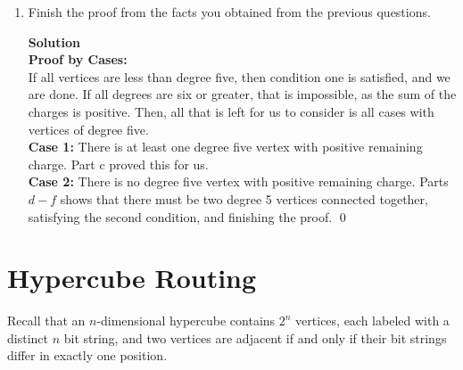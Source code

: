 \documentclass[11pt]{article}
\newcommand*{\Question}[1]{\section{#1}}
\newenvironment{Parts}{\begin{enumerate}[label=(\alph*)]}{\end{enumerate}}
\newcommand*{\Part}{\item}
\begin{document}
\begin{Parts}
\Part Finish the proof from the facts you obtained from the previous
  questions.
\begin{mdframed} \textbf{Solution} \\
\textbf{Proof by Cases: }\\
If all vertices are less than degree five, then condition one is satisfied, and we are done. If all degrees are six or greater, that is impossible, as the sum of the charges is positive. Then, all that is left for us to consider is all cases with vertices of degree five. \\
\textbf{Case 1: }There is at least one degree five vertex with positive remaining charge. Part c proved this for us. \\
\textbf{Case 2: }There is no degree five vertex with positive remaining charge. Parts $d-f$ shows that there must be two degree 5 vertices connected together, satisfying the second condition, and finishing the proof. \qed
\end{mdframed}

\end{Parts}


\Question{Hypercube Routing}

Recall that an $n$-dimensional hypercube contains $2^n$ vertices, each labeled
with a distinct $n$ bit string, and two vertices are adjacent if and only if
their bit strings differ in exactly one position.
\end{document}
